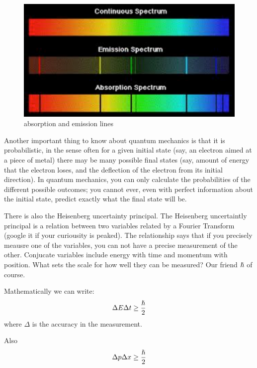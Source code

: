 \begin{figure}[h]
\centering\includegraphics[scale=0.5]{./ElementaryParticles/Pictures/fig6.pdf}
\caption{absorption and emission lines}
\label{fig:light}
\end{figure}


Another important thing to know about quantum mechanics is that it is probabilistic, in the sense often for a given initial state (say, an electron aimed at a piece of metal) there may be many possible final states (say, amount of energy that the electron loses, and the deflection of the electron from its initial direction).  In quantum mechanics, you can only calculate the probabilities of the different possible outcomes; you cannot ever, even with perfect information about the initial state, predict exactly what the final state will be.

There is also the Heisenberg uncertainty principal.  The Heisenberg uncertaintly principal is a relation between two variables related by a Fourier Transform (google it if your curiousity is peaked).  The relationship says that if you precisely meausre one of the variables, you can not have a precise measurement of the other.   Conjucate variables include energy with time and momentum with position.  What sets the scale for how well they can be measured?  Our friend ${\rm \hslash}$ of course.

Mathematically we can write:
\begin{equation}
\Delta E \Delta t \ge {\hslash \over 2}
\end{equation} 
where $\Delta$ is the accuracy in the measurement.

Also
\begin{equation}
\Delta p \Delta x \ge {\hslash \over 2}
\end{equation} 

